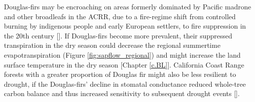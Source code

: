 Douglas-firs may be encroaching on areas formerly dominated by Pacific madrone and other broadleafs in the ACRR, due to a fire-regime shift from controlled burning by indigenous people and early European settlers, to fire suppression in the 20th century [\cite{johnsonACRR}].  If Douglas-firs become more prevalent, their suppressed transpiration in the dry season could decrease the regional summertime evapotranspiration (Figure \ref{fig:sapflow_regional}) and might increase the land surface temperature in the dry season [Chapter \ref{c.BL}].  California Coast Range forests with a greater proportion of Douglas fir might also be less resilient to drought, if the Douglas-firs' decline in stomatal conductance reduced whole-tree carbon balance and thus increased sensitivity to subsequent drought events [\cite{mcdowell2008mechanisms}].

